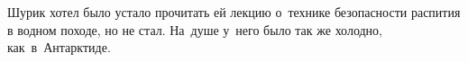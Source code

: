 {	Шурик хотел было устало прочитать ей лекцию о~технике безопасности распития в водном походе, но не стал.  На~душе у~него было так же холодно, как~в~Антарктиде.%
	
	\vspace{-0.2cm}
%	
	\begin{center}
	\end{center}
}